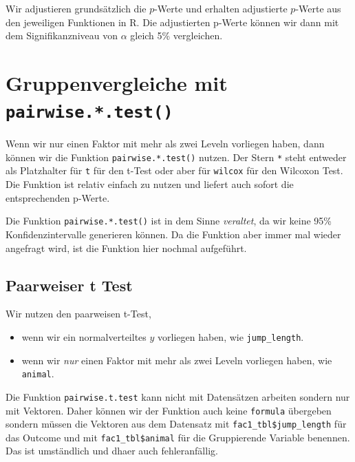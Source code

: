 \documentclass[
  letterpaper,
  DIV=11,
  oneside]{scrreport}
\providecommand{\tightlist}{%
  \setlength{\itemsep}{0pt}\setlength{\parskip}{0pt}}\usepackage{longtable,booktabs,array}
\begin{document}
Wir adjustieren grundsätzlich die \(p\)-Werte und erhalten adjustierte
\(p\)-Werte aus den jeweiligen Funktionen in R. Die adjustierten p-Werte
können wir dann mit dem Signifikanzniveau von \(\alpha\) gleich 5\%
vergleichen.

\hypertarget{sec-posthoc-pairwise}{%
\section{\texorpdfstring{Gruppenvergleiche mit
\texttt{pairwise.*.test()}}{Gruppenvergleiche mit pairwise.*.test()}}\label{sec-posthoc-pairwise}}

{}

Wenn wir nur einen Faktor mit mehr als zwei Leveln vorliegen haben, dann
können wir die Funktion \texttt{pairwise.*.test()} nutzen. Der Stern
\texttt{*} steht entweder als Platzhalter für \texttt{t} für den t-Test
oder aber für \texttt{wilcox} für den Wilcoxon Test. Die Funktion ist
relativ einfach zu nutzen und liefert auch sofort die entsprechenden
p-Werte.

Die Funktion \texttt{pairwise.*.test()} ist in dem Sinne
\emph{veraltet}, da wir keine 95\% Konfidenzintervalle generieren
können. Da die Funktion aber immer mal wieder angefragt wird, ist die
Funktion hier nochmal aufgeführt.

\hypertarget{paarweiser-t-test}{%
\subsection{Paarweiser t Test}\label{paarweiser-t-test}}

Wir nutzen den paarweisen t-Test,

\begin{itemize}
\tightlist
\item
  wenn wir ein normalverteiltes \(y\) vorliegen haben, wie
  \texttt{jump\_length}.
\item
  wenn wir \emph{nur} einen Faktor mit mehr als zwei Leveln vorliegen
  haben, wie \texttt{animal}.
\end{itemize}

Die Funktion \texttt{pairwise.t.test} kann nicht mit Datensätzen
arbeiten sondern nur mit Vektoren. Daher können wir der Funktion auch
keine \texttt{formula} übergeben sondern müssen die Vektoren aus dem
Datensatz mit \texttt{fac1\_tbl\$jump\_length} für das Outcome und mit
\texttt{fac1\_tbl\$animal} für die Gruppierende Variable benennen. Das
ist umständlich und dhaer auch fehleranfällig.
\end{document}
